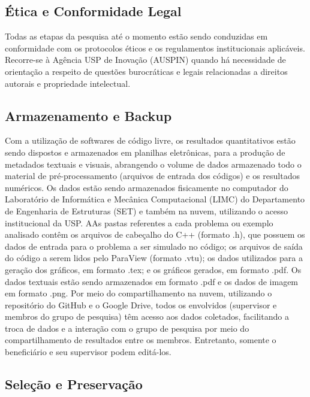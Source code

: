 \subsection{Ética e Conformidade Legal}

Todas as etapas da pesquisa até o momento estão sendo conduzidas em conformidade com os protocolos éticos e os regulamentos institucionais aplicáveis. Recorre-se à Agência USP de Inovação (AUSPIN) quando há necessidade de orientação a respeito de questões burocráticas e legais relacionadas a direitos autorais e propriedade intelectual.

\subsection{Armazenamento e Backup}

Com a utilização de softwares de código livre, os resultados quantitativos estão sendo dispostos e armazenados em planilhas eletrônicas, para a produção de metadados textuais e visuais, abrangendo o volume de dados armazenado todo o material de pré-processamento (arquivos de entrada dos códigos) e os resultados numéricos. Os dados estão sendo armazenados fisicamente no computador do Laboratório de Informática e Mecânica Computacional (LIMC) do Departamento de Engenharia de Estruturas (SET) e também na nuvem, utilizando o acesso institucional da USP. AAs pastas referentes a cada problema ou exemplo analisado contêm os arquivos de cabeçalho do C++ (formato .h), que possuem os dados de entrada para o problema a ser simulado no código; os arquivos de saída do código a serem lidos pelo ParaView (formato .vtu); os dados utilizados para a geração dos gráficos, em formato .tex; e os gráficos gerados, em formato .pdf. Os dados textuais estão sendo armazenados em formato .pdf e os dados de imagem em formato .png. Por meio do compartilhamento na nuvem, utilizando o repositório do GitHub e o Google Drive, todos os envolvidos (supervisor e membros do grupo de pesquisa) têm acesso aos dados coletados, facilitando a troca de dados e a interação com o grupo de pesquisa por meio do compartilhamento de resultados entre os membros. Entretanto, somente o beneficiário e seu supervisor podem editá-los.

\subsection{Seleção e Preservação}

